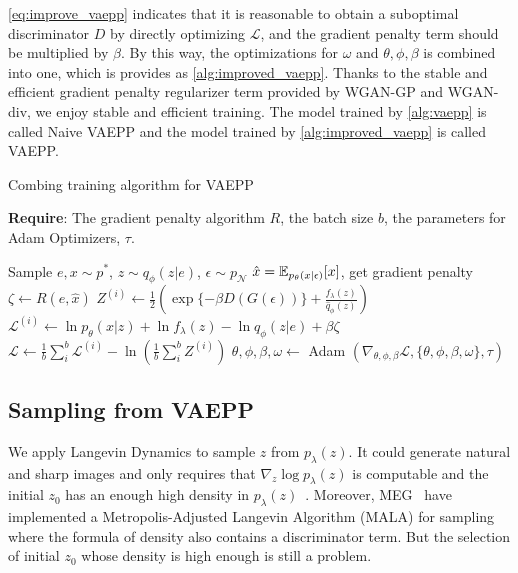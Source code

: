 \cref{eq:improve_vaepp} indicates that it is reasonable to obtain a suboptimal discriminator $D$ by directly optimizing $\mathcal{L}$, and the gradient penalty term should be multiplied by $\beta$. By this way, the optimizations for $\omega$ and $\theta, \phi, \beta$ is combined into one, which is provides as \cref{alg:improved_vaepp}. 
Thanks to the stable and efficient gradient penalty regularizer term provided by WGAN-GP and WGAN-div, we enjoy stable and efficient training. The model trained by \cref{alg:vaepp} is called Naive VAEPP and the model trained by \cref{alg:improved_vaepp} is called VAEPP. 
\begin{algorithm}[tb]
\caption{Combing training algorithm for VAEPP}
\label{alg:improved_vaepp}
\textbf{Require}: The gradient penalty algorithm $R$, the batch size $b$, the parameters for Adam Optimizers, $\tau$. 

\begin{algorithmic}[1] %
\STATE Sample $e, x \sim p^*$, $z \sim q_\phi(z|e)$, $\epsilon \sim p_\mathcal{N}$
\STATE $\hat{x} = \operatorname{\mathbb{E}}_{p_\theta(x|\epsilon)}[x]$, get gradient penalty $\zeta \gets R(e, \hat{x})$ 
\STATE $Z^{(i)} \gets \frac{1}{2}(\exp\{-\beta D(G(\epsilon))\} + \frac{f_\lambda(z)}{\hat{q}_\phi(z)})$
\STATE $\mathcal{L}^{(i)} \gets \ln p_\theta(x|z) + \ln f_\lambda(z) - \ln q_\phi(z|e) + \beta \zeta$
\ENDFOR
\STATE $\mathcal{L} \gets \frac{1}{b}\sum_{i}^b \mathcal{L}^{(i)} - \ln (\frac{1}{b}\sum_{i}^b Z^{(i)})$
\STATE $\theta, \phi, \beta, \omega \gets $ Adam $(\nabla_{\theta, \phi, \beta} \mathcal{L}, \{\theta, \phi, \beta, \omega\}, \tau)$
\ENDWHILE
\end{algorithmic}
\end{algorithm}

\subsection{Sampling from VAEPP}
We apply Langevin Dynamics to sample $z$ from $p_\lambda(z)$. It could generate natural and sharp images and only requires that $\nabla_z \log p_\lambda(z)$ is computable and the initial $z_0$ has an enough high density in $p_\lambda(z)$~\cite{song2019generative}. 
Moreover, MEG~\cite{kumar2019maximum} have implemented a Metropolis-Adjusted Langevin Algorithm (MALA) for sampling where the formula of density also contains a discriminator term. But the selection of initial $z_0$ whose density is high enough is still a problem. 

